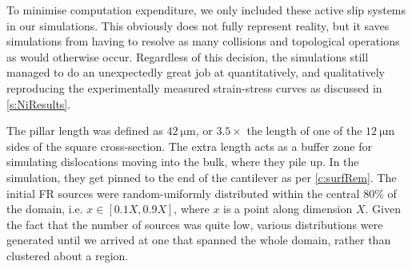To minimise computation expenditure, we only included these active slip systems in our simulations. This obviously does not fully represent reality, but it saves simulations from having to resolve as many collisions and topological operations as would otherwise occur. Regardless of this decision, the simulations still managed to do an unexpectedly great job at quantitatively, and qualitatively reproducing the experimentally measured strain-stress curves as discussed in \cref{s:NiResults}.

The pillar length was defined as $\SI{42}{\micro\metre}$, or $3.5\times$ the length of one of the $\SI{12}{\micro\metre}$ sides of the square cross-section. The extra length acts as a buffer zone for simulating dislocations moving into the bulk, where they pile up. In the simulation, they get pinned to the end of the cantilever as per \cref{c:surfRem}. The initial FR sources were random-uniformly distributed within the central $80\%$ of the domain, i.e. $x \in [0.1X, 0.9X]$, where $x$ is a point along dimension $X$. Given the fact that the number of sources was quite low, various distributions were generated until we arrived at one that spanned the whole domain, rather than clustered about a region.

